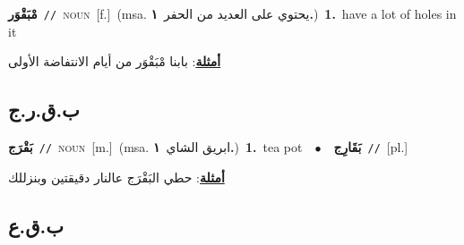 \documentclass[10pt,a4paper,twoside]{article} %
\begin{document}
\begin{multicols}{2}
{\setlength\topsep{0pt}\textbf{\foreignlanguage{arabic}{مْبَقْوَر}}\ {\color{gray}\texttt{//}\color{black}}\ \textsc{noun}\ [f.]\ \color{gray}(msa. \foreignlanguage{arabic}{يحتوي على العديد من الحفر}~\foreignlanguage{arabic}{\textbf{١.}})\color{black}\ \textbf{1.}~have a lot of holes in it\  \begin{flushright}\color{gray}\foreignlanguage{arabic}{\textbf{\underline{\foreignlanguage{arabic}{أمثلة}}}: بابنا مْبَقْوَر من أيام الانتفاضة الأولى}\end{flushright}\color{black}} \vspace{2mm}

\vspace{-3mm}
\subsection*{\color{blue}\foreignlanguage{arabic}{ب.ق.ر.ج}\color{blue}{}} 

{\setlength\topsep{0pt}\textbf{\foreignlanguage{arabic}{بَقْرَج}}\ {\color{gray}\texttt{//}\color{black}}\ \textsc{noun}\ [m.]\ \color{gray}(msa. \foreignlanguage{arabic}{ابريق الشاي}~\foreignlanguage{arabic}{\textbf{١.}})\color{black}\ \textbf{1.}~tea pot\ \ $\bullet$\ \ \setlength\topsep{0pt}\textbf{\foreignlanguage{arabic}{بَقَارِج}}\ {\color{gray}\texttt{//}\color{black}}\ [pl.]\  \begin{flushright}\color{gray}\foreignlanguage{arabic}{\textbf{\underline{\foreignlanguage{arabic}{أمثلة}}}: حطي البَقْرَج عالنار دقيقتين وبنزللك}\end{flushright}\color{black}} \vspace{2mm}

\vspace{-3mm}
\subsection*{\color{blue}\foreignlanguage{arabic}{ب.ق.ع}\color{blue}{}} 


\end{multicols}
\end{document}

